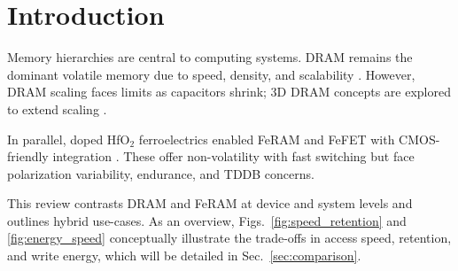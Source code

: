 
\section{Introduction}

Memory hierarchies are central to computing systems. 
DRAM remains the dominant volatile memory due to speed, density, and scalability \cite{choi2022,kim2021_dram}. 
However, DRAM scaling faces limits as capacitors shrink; 3D DRAM concepts are explored to extend scaling \cite{iedm2023_dram}.

In parallel, doped HfO$_2$ ferroelectrics enabled FeRAM and FeFET with CMOS-friendly integration \cite{boscke2011,mueller2012}. 
These offer non-volatility with fast switching but face polarization variability, endurance, and TDDB concerns. 

This review contrasts DRAM and FeRAM at device and system levels and outlines hybrid use-cases. 
As an overview, Figs.~\ref{fig:speed_retention} and \ref{fig:energy_speed} conceptually illustrate the trade-offs in access speed, retention, and write energy, which will be detailed in Sec.~\ref{sec:comparison}.
